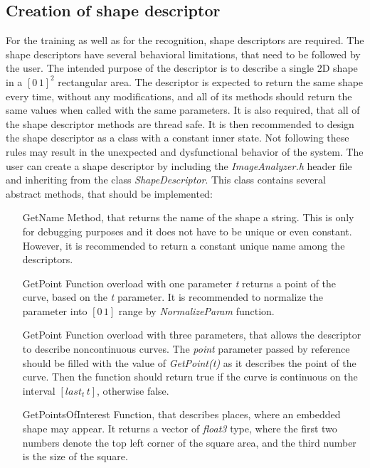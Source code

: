 \subsection{Creation of shape descriptor}
For the training as well as for the recognition, shape descriptors are required. The shape descriptors have several behavioral limitations, that need to be followed by the user. The intended purpose of the descriptor is to describe a single 2D shape in a $[0\,1]^2$ rectangular area. The descriptor is expected to return the same shape every time, without any modifications, and all of its methods should return the same values when called with the same parameters. It is also required, that all of the shape descriptor methods are thread safe. It is then recommended to design the shape descriptor as a class with a constant inner state. Not following these rules may result in the unexpected and dysfunctional behavior of the system. The user can create a shape descriptor by including the \emph{ImageAnalyzer.h} header file and inheriting from the class \emph{ShapeDescriptor}. This class contains several abstract methods, that should be implemented:
\begin{enumerate}
\item [GetName] Method, that returns the name of the shape a string. This is only for debugging purposes and it does not have to be unique or even constant. However, it is recommended to return a constant unique name among the descriptors.

\item [GetPoint] Function overload with one parameter \emph{t} returns a point of the curve, based on the \emph{t} parameter. It is recommended to normalize the parameter into $[0\,1]$ range by \emph{NormalizeParam} function.

\item [GetPoint] Function overload with three parameters, that allows the descriptor to describe noncontinuous curves. The \emph{point} parameter passed by reference should be filled with the value of \emph{GetPoint(t)} as it describes the point of the curve. Then the function should return true if the curve is continuous on the interval $[last_t\, t]$, otherwise false.

\item [GetPointsOfInterest] Function, that describes places, where an embedded shape may appear. It returns a vector of \emph{float3} type, where the first two numbers denote the top left corner of the square area, and the third number is the size of the square.
\end{enumerate}


